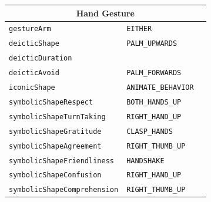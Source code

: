 \documentclass{CSSRforAfrica}
\begin{document}
\begin{table}[H]
\begin{center}
\begin{tabular}{|l l l|}
\hline
\multicolumn{3}{|c|}{{\footnotesize Hand Gesture}} \vspace{-0mm}\\
\hline
{\footnotesize \verb+gestureArm+} 	                 & {\footnotesize \verb+EITHER+} & {\footnotesize  }\vspace{-1.01mm}\\
{\footnotesize \verb+deicticShape+} 	                 & {\footnotesize \verb+PALM_UPWARDS+} & {\footnotesize  }\vspace{-1.01mm}\\
{\footnotesize \verb+deicticDuration+} 	                 & {\footnotesize \verb++}  & {\footnotesize  }\vspace{-1.01mm}\\
{\footnotesize \verb+deicticAvoid+} 	                 & {\footnotesize \verb+PALM_FORWARDS+}  & {\footnotesize  }\vspace{-1.01mm}\\
{\footnotesize \verb+iconicShape+} 	                 & {\footnotesize \verb+ANIMATE_BEHAVIOR+}  & {\footnotesize  }\vspace{-1.01mm}\\
{\footnotesize \verb+symbolicShapeRespect+} 	  & {\footnotesize \verb+BOTH_HANDS_UP+ } & {\footnotesize  }\vspace{-1.01mm}\\
{\footnotesize \verb+symbolicShapeTurnTaking+}  & {\footnotesize \verb+RIGHT_HAND_UP+ } & {\footnotesize  }\vspace{-1.01mm}\\
{\footnotesize \verb+symbolicShapeGratitude+} 	  & {\footnotesize \verb+CLASP_HANDS+} & {\footnotesize  }\vspace{-1.01mm}\\
{\footnotesize \verb+symbolicShapeAgreement+}   & {\footnotesize \verb+RIGHT_THUMB_UP+}\ & {\footnotesize  }\vspace{-1.01mm}\\
{\footnotesize \verb+symbolicShapeFriendliness+}  & {\footnotesize \verb+HANDSHAKE+ } & {\footnotesize  }\vspace{-1.01mm}\\
{\footnotesize \verb+symbolicShapeConfusion+} 	   & {\footnotesize \verb+RIGHT_HAND_UP+ } & {\footnotesize  }\vspace{-1.01mm}\\
{\footnotesize \verb+symbolicShapeComprehension+} 	 & {\footnotesize \verb+RIGHT_THUMB_UP+ } & {\footnotesize  }\vspace{-1.01mm}\\

\end{tabular}
\end{center}
\end{table}
\end{document}
